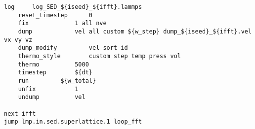 \begin{singlespace}
\begin{verbatim}
log 	log_SED_${iseed}_${ifft}.lammps
	reset_timestep  	0
	fix 			1 all nve
	dump 			vel all custom ${w_step} dump_${iseed}_${ifft}.vel vx vy vz
	dump_modify 		vel sort id
	thermo_style 		custom step temp press vol
	thermo			5000
	timestep		${dt}
	run			${w_total}
	unfix			1
	undump			vel

next ifft
jump lmp.in.sed.superlattice.1 loop_fft

\end{verbatim}
\end{singlespace}
